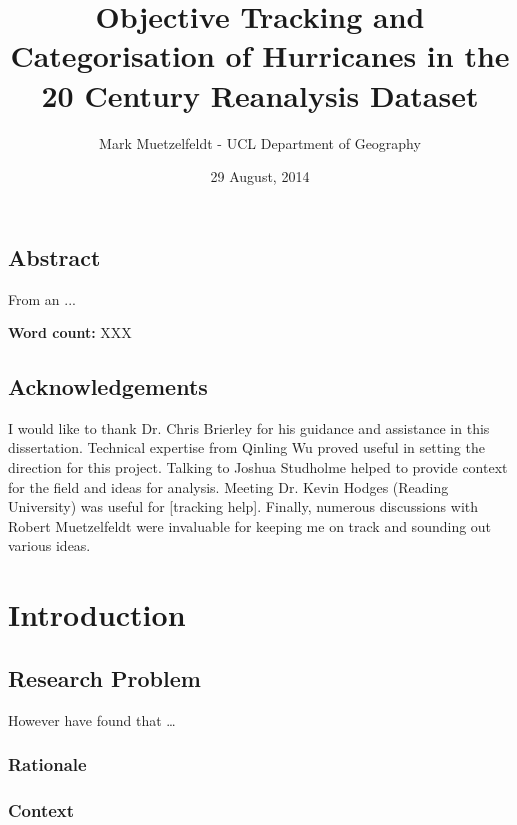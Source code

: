 \documentclass[pdftex,12pt,a4paper]{report}
\title{Objective Tracking and Categorisation of Hurricanes in the 20\ts{th} Century Reanalysis Dataset}
\author{Mark Muetzelfeldt - UCL Department of Geography}
\date{29 August, 2014}
\begin{document}


\onehalfspacing
\section*{Abstract}

From an ...

\begin{center}
\textbf{Word count:} XXX
\end{center}

\section*{Acknowledgements}

I would like to thank Dr. Chris Brierley for his guidance and assistance in this dissertation.
Technical expertise from Qinling Wu proved useful in setting the direction for this project. 
Talking to Joshua Studholme helped to provide context for the field and ideas for analysis. %
Meeting Dr. Kevin Hodges (Reading University) was useful for [tracking help]. 
Finally, numerous discussions with Robert Muetzelfeldt were invaluable for keeping me on track and sounding out various ideas.

\newpage


\tableofcontents

\chapter{Introduction}

\section{Research Problem}

However \textcite{walshObjective1997} have found that \dots

\subsection{Rationale}

\subsection{Context}
\end{document}
